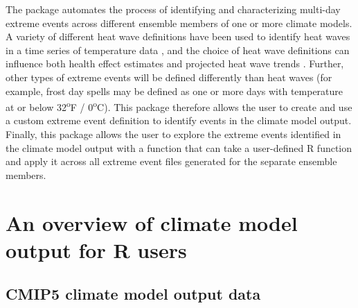 The  package automates the process of identifying
and characterizing multi-day extreme events across different ensemble
members of one or more climate models. A variety of different heat wave
definitions have been used to identify heat waves in a time series of
temperature data \citep{smith2013heat}, and the choice of heat wave
definitions can influence both health effect estimates
\citep{chen2015influence, kent2014heat} and projected heat wave trends
\citep{smith2013heat}. Further, other types of extreme events will be
defined differently than heat waves (for example, frost day spells may
be defined as one or more days with temperature at or below
32\textsuperscript{o}F / 0\textsuperscript{o}C). This package therefore
allows the user to create and use a custom extreme event definition to
identify events in the climate model output. Finally, this package
allows the user to explore the extreme events identified in the climate
model output with a function that can take a user-defined R function and
apply it across all extreme event files generated for the separate
ensemble members.

\section{An overview of climate model output for R
users}\label{an-overview-of-climate-model-output-for-r-users}

\subsection{CMIP5 climate model output
data}\label{cmip5-climate-model-output-data}

